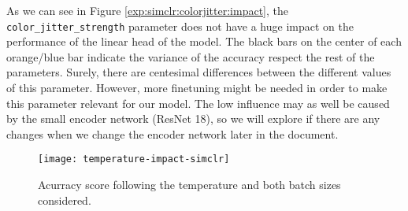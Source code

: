 As we can see in Figure \ref{exp:simclr:colorjitter:impact}, the \lstinline{color_jitter_strength} parameter does not have a huge impact on the performance of the linear head of the model. The black bars on the center of each orange/blue bar indicate the variance of the accuracy respect the rest of the parameters. Surely, there are centesimal differences between the different values of this parameter. However, more finetuning might be needed in order to make this parameter relevant for our model. The low influence may as well be caused by the small encoder network (ResNet 18), so we will explore if there are any changes when we change the encoder network later in the document.

\begin{figure}[H] 
    \centering
    \label{exp:simclr:temperature:impact}
        \texttt{[image: temperature-impact-simclr]}%
       
        \caption{Acurracy score following the temperature and both batch sizes considered.}
\end{figure}
